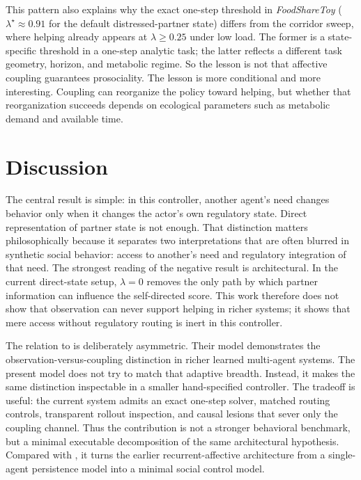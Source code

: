 \documentclass[letterpaper]{article}
\begin{document}
This pattern also explains why the exact one-step threshold in \emph{FoodShareToy} (\(\lambda^\star \approx 0.91\) for the default distressed-partner state) differs from the corridor sweep, where helping already appears at \(\lambda \ge 0.25\) under low load. The former is a state-specific threshold in a one-step analytic task; the latter reflects a different task geometry, horizon, and metabolic regime. So the lesson is not that affective coupling guarantees prosociality. The lesson is more conditional and more interesting. Coupling can reorganize the policy toward helping, but whether that reorganization succeeds depends on ecological parameters such as metabolic demand and available time.



\section{Discussion}

The central result is simple: in this controller, another agent's need changes behavior only when it changes the actor's own regulatory state. Direct representation of partner state is not enough. That distinction matters philosophically because it separates two interpretations that are often blurred in synthetic social behavior: access to another's need and regulatory integration of that need. The strongest reading of the negative result is architectural. In the current direct-state setup, $\lambda=0$ removes the only path by which partner information can influence the self-directed score. This work therefore does not show that observation can never support helping in richer systems; it shows that mere access without regulatory routing is inert in this controller.

The relation to \citet{YoshidaMan2025HomeostaticCoupling} is deliberately asymmetric. Their model demonstrates the observation-versus-coupling distinction in richer learned multi-agent systems. The present model does not try to match that adaptive breadth. Instead, it makes the same distinction inspectable in a smaller hand-specified controller. The tradeoff is useful: the current system admits an exact one-step solver, matched routing controls, transparent rollout inspection, and causal lesions that sever only the coupling channel. Thus the contribution is not a stronger behavioral benchmark, but a minimal executable decomposition of the same architectural hypothesis. Compared with \citet{Sanyal2026ReCoNIpsundrum}, it turns the earlier recurrent-affective architecture from a single-agent persistence model into a minimal social control model.
\end{document}
